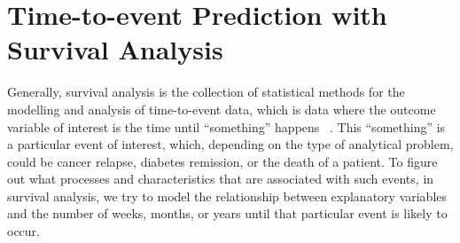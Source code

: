 \chapter{Time-to-event Prediction with Survival Analysis}


Generally, 
survival analysis is the collection of statistical methods
for the modelling and analysis of time-to-event data,
which is data where the outcome variable of interest 
is the time until \enquote{something} happens~%
\autocite{kleinbaumSurvival2011}.
This \enquote{something} is a particular event of interest,
which, depending on the type of analytical problem, 
could be cancer relapse, 
diabetes remission,
or the death of a patient.
To figure out what processes and characteristics 
that are associated with such events, 
in survival analysis, we try to model the relationship between
explanatory variables and the number of weeks, months, or years 
until that particular event is likely to occur. 


